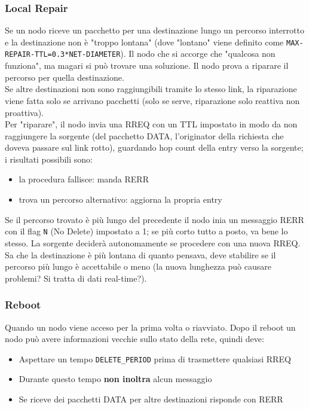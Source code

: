 \subsubsection{Local Repair}

Se un nodo riceve un pacchetto per una destinazione lungo un percorso interrotto e la destinazione non è "troppo lontana" (dove "lontano" viene definito come \texttt{MAX-REPAIR-TTL=0.3*NET-DIAMETER}). Il nodo che si accorge che "qualcosa non funziona", ma magari si può trovare una soluzione. Il nodo prova a riparare il percorso per quella destinazione.\\

Se altre destinazioni non sono raggiungibili tramite lo stesso link, la riparazione viene fatta solo se arrivano pacchetti (solo se serve, riparazione solo reattiva non proattiva).\\

Per "riparare", il nodo invia una RREQ con un TTL impostato in modo da non raggiungere la sorgente (del pacchetto DATA, l'originator della richiesta che doveva passare sul link rotto), guardando hop count della entry verso la sorgente; i risultati possibili sono:
\begin{itemize}
	\item la procedura fallisce: manda RERR
	\item trova un percorso alternativo: aggiorna la propria entry
\end{itemize}

Se il percorso trovato è più lungo del precedente il nodo inia un messaggio RERR con il flag \texttt{N} (No Delete) impostato a 1; se più corto tutto a posto, va bene lo stesso. La sorgente deciderà autonomamente se procedere con una nuova RREQ. Sa che la destinazione è più lontana di quanto pensava, deve stabilire se il percorso più lungo è accettabile o meno (la nuova lunghezza può causare problemi? Si tratta di dati real-time?).\\

\subsubsection{Reboot}

Quando un nodo viene acceso per la prima volta o riavviato. Dopo il reboot un nodo può avere informazioni vecchie sullo stato della rete, quindi deve: 
\begin{itemize}
	\item Aspettare un tempo \texttt{DELETE\_PERIOD} prima di trasmettere qualsiasi RREQ
	\item Durante questo tempo \textbf{non inoltra} alcun messaggio
	\item Se riceve dei pacchetti DATA per altre destinazioni risponde con RERR
\end{itemize}
